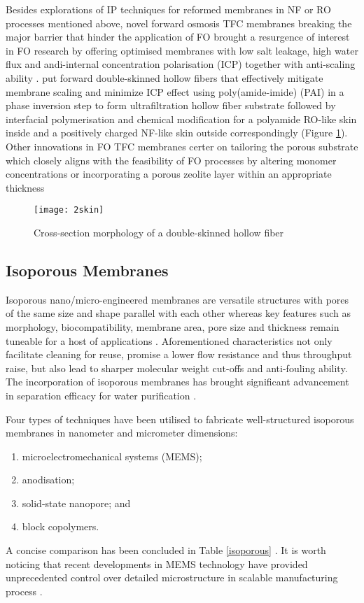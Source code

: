\documentclass[a4paper,12pt]{report}
\begin{document}
Besides explorations of IP techniques for reformed membranes in NF or RO processes mentioned above, novel forward osmosis TFC membranes breaking the major barrier that hinder the application of FO brought a resurgence of interest in FO research by offering optimised membranes with low salt leakage, high water flux and andi-internal concentration polarisation (ICP) together with anti-scaling ability \citep{31achou}. \citep{32afang} put forward double-skinned hollow fibers that effectively mitigate membrane scaling and minimize ICP effect using poly(amide-imide) (PAI) in a phase inversion step to form ultrafiltration hollow fiber substrate followed by interfacial polymerisation and chemical modification for a polyamide RO-like skin inside and a positively charged NF-like skin outside correspondingly (Figure \ref{2skin}). Other innovations in FO TFC membranes certer on tailoring the porous substrate which closely aligns with the feasibility of FO processes \citep{33shi} by altering monomer concentrations \citep{32bwei} or incorporating a porous zeolite layer within an appropriate thickness \citep{34ama, 34bma}

\begin{figure}[h!]
\centering
  \texttt{[image: 2skin]}
  \caption{Cross-section morphology of a double-skinned hollow fiber}
  \label{2skin}
\end{figure}



\subsection{Isoporous Membranes}
Isoporous nano/micro-engineered membranes are versatile structures with pores of the same size and shape parallel with each other whereas key features such as morphology, biocompatibility, membrane area, pore size and thickness remain tuneable for a host of applications \citep{13war}. Aforementioned characteristics not only facilitate cleaning for reuse, promise a lower flow resistance and thus throughput raise, but also lead to sharper molecular weight cut-offs and anti-fouling ability. The incorporation of isoporous membranes has brought significant advancement in separation efficacy for water purification \citep{11war, 11pau}. 

Four types of techniques have been utilised to fabricate well-structured isoporous membranes in nanometer and micrometer dimensions:
\begin{enumerate}
\item microelectromechanical systems (MEMS); 
\item anodisation;
\item solid-state nanopore; and
\item block copolymers. 
\end{enumerate}
A concise comparison has been concluded in Table \ref{isoporous} \citep{13war}. It is worth noticing that recent developments in MEMS technology have provided unprecedented control over detailed microstructure in scalable manufacturing process \citep{62ari}.
\end{document}
